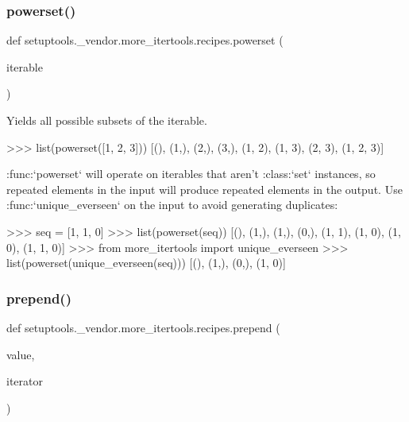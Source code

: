 \subsubsection{\texorpdfstring{powerset()}{powerset()}}
{\footnotesize\ttfamily def setuptools.\+\_\+vendor.\+more\+\_\+itertools.\+recipes.\+powerset (\begin{DoxyParamCaption}\item[{}]{iterable }\end{DoxyParamCaption})}

\begin{DoxyVerb}Yields all possible subsets of the iterable.

    >>> list(powerset([1, 2, 3]))
    [(), (1,), (2,), (3,), (1, 2), (1, 3), (2, 3), (1, 2, 3)]

:func:`powerset` will operate on iterables that aren't :class:`set`
instances, so repeated elements in the input will produce repeated elements
in the output. Use :func:`unique_everseen` on the input to avoid generating
duplicates:

    >>> seq = [1, 1, 0]
    >>> list(powerset(seq))
    [(), (1,), (1,), (0,), (1, 1), (1, 0), (1, 0), (1, 1, 0)]
    >>> from more_itertools import unique_everseen
    >>> list(powerset(unique_everseen(seq)))
    [(), (1,), (0,), (1, 0)]\end{DoxyVerb}
 \mbox{\label{namespacesetuptools_1_1__vendor_1_1more__itertools_1_1recipes_ae8cf65858b8186301e2b05fd1033f2a6}} 
\subsubsection{\texorpdfstring{prepend()}{prepend()}}
{\footnotesize\ttfamily def setuptools.\+\_\+vendor.\+more\+\_\+itertools.\+recipes.\+prepend (\begin{DoxyParamCaption}\item[{}]{value,  }\item[{}]{iterator }\end{DoxyParamCaption})}

